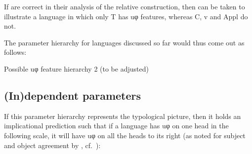 \documentclass[output=paper]{langsci/langscibook}
\begin{document}
If \citet{JenksEtAl2017} are correct in their analysis of the relative
construction, then  can be taken to illustrate a language in which
only T has uφ features, whereas C, v and Appl do not.

The parameter hierarchy for  languages
discussed so far would thus come out as follows:\largerpage

\ea Possible uφ feature hierarchy 2 (to be adjusted)
\z

\subsection{(In)dependent parameters}\label{sub:3.3.3}

If this parameter hierarchy represents the typological picture, then it holds
an implicational prediction such that if a language has uφ on one head in the
following scale, it will have uφ on all the heads to its right (as noted for
subject and object
agreement by \citealt{Moravcsik1974}, cf.\
\citealt{Givon1976,Bobaljik2008}):
\end{document}
